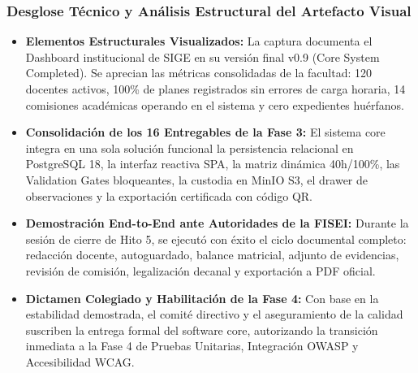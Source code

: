 \documentclass[12pt,a4paper]{article}
\begin{document}
\subsubsection*{Desglose Técnico y Análisis Estructural del Artefacto Visual}
\begin{itemize}[leftmargin=1.5em, itemsep=3pt]
    \item \textbf{Elementos Estructurales Visualizados:} La captura documenta el Dashboard institucional de SIGE en su versión final v0.9 (Core System Completed). Se aprecian las métricas consolidadas de la facultad: 120 docentes activos, 100\% de planes registrados sin errores de carga horaria, 14 comisiones académicas operando en el sistema y cero expedientes huérfanos.
    \item \textbf{Consolidación de los 16 Entregables de la Fase 3:} El sistema core integra en una sola solución funcional la persistencia relacional en PostgreSQL 18, la interfaz reactiva SPA, la matriz dinámica 40h/100\%, las Validation Gates bloqueantes, la custodia en MinIO S3, el drawer de observaciones y la exportación certificada con código QR.
    \item \textbf{Demostración End-to-End ante Autoridades de la FISEI:} Durante la sesión de cierre de Hito 5, se ejecutó con éxito el ciclo documental completo: redacción docente, autoguardado, balance matricial, adjunto de evidencias, revisión de comisión, legalización decanal y exportación a PDF oficial.
    \item \textbf{Dictamen Colegiado y Habilitación de la Fase 4:} Con base en la estabilidad demostrada, el comité directivo y el aseguramiento de la calidad suscriben la entrega formal del software core, autorizando la transición inmediata a la Fase 4 de Pruebas Unitarias, Integración OWASP y Accesibilidad WCAG.
\end{itemize}
\end{document}
